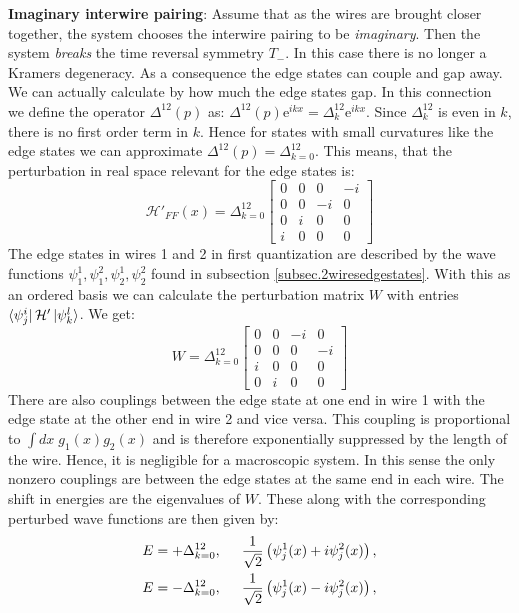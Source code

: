 \textbf{Imaginary interwire pairing}: Assume that as the wires are brought closer together, the system chooses the interwire pairing to be \textit{imaginary}. Then the system \textit{breaks} the time reversal symmetry $T_-$. In this case there is no longer a Kramers degeneracy. As a consequence the edge states can couple and gap away. We can actually calculate by how much the edge states gap. In this connection we define the operator $\Delta^{12}(p)$ as: $\Delta^{12}(p)\text{e}^{ikx} = \Delta^{12}_k\text{e}^{ikx}$. Since $\Delta^{12}_k$ is even in $k$, there is no first order term in $k$. Hence for states with small curvatures like the edge states we can approximate $\Delta^{12}(p) = \Delta^{12}_{k=0}$. This means, that the perturbation in real space relevant for the edge states is:
\begin{equation}
\mathcal{H}'_{FF}(x) = \Delta^{12}_{k=0}\begin{bmatrix} 
0 & 0 &  0 & -i \\
0 & 0 & -i & 0 \\
0 & i & 0  & 0 \\
i & 0 & 0  & 0  \end{bmatrix}
\label{eq.interwirepairingrealspace}
\end{equation}
The edge states in wires 1 and 2 in first quantization are described by the wave functions $\psi^1_1, \psi^2_1, \psi^1_2, \psi^2_2$ found in subsection \ref{subsec.2wiresedgestates}. With this as an ordered basis we can calculate the perturbation matrix $W$ with entries $\bra{\psi^{i}_j}\mathcal{H}'\ket{\psi^{l}_k}$. We get:
\begin{equation}
W = \Delta^{12}_{k=0} \begin{bmatrix} 
0 & 0 & -i &  0 \\
0 & 0 &  0 & -i \\
i & 0 &  0 & 0 \\
0 & i &  0 & 0 \end{bmatrix} \nonumber
\end{equation}  
There are also couplings between the edge state at one end in wire 1 with the edge state at the other end in wire 2 and vice versa. This coupling is proportional to $\int dx \; g_1(x)g_2(x)$ and is therefore exponentially suppressed by the length of the wire. Hence, it is negligible for a macroscopic system. In this sense the only nonzero couplings are between the edge states at the same end in each wire. The shift in energies are the eigenvalues of $W$. These along with the corresponding perturbed wave functions are then given by:
\begin{align}
E &= +\Delta^{12}_{k=0}, \hspace{0.5cm} \frac{1}{\sqrt{2}}\left( \psi^1_j(x) + i\psi^2_j(x) \right), \nonumber \\
E &= -\Delta^{12}_{k=0}, \hspace{0.5cm} \frac{1}{\sqrt{2}}\left(\psi^1_j(x) - i\psi^2_j(x) \right),
\label{eq.perturbededgestates}
\end{align}
